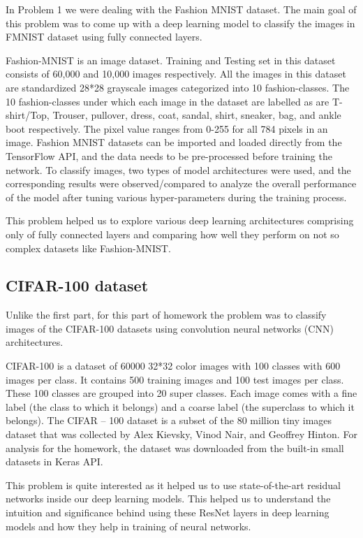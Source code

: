 \documentclass{article}
\begin{document}
In Problem 1 we were dealing with the Fashion MNIST dataset. The main goal of this problem was to come up with a deep learning model to classify the images in FMNIST dataset using fully connected layers.

Fashion-MNIST is an image dataset. Training and Testing set in this dataset consists of 60,000 and 10,000 images respectively. All the images in this dataset are standardized 28*28 grayscale images categorized into 10 fashion-classes. The 10 fashion-classes under which each image in the dataset are labelled as are T-shirt/Top, Trouser, pullover, dress, coat, sandal, shirt, sneaker, bag, and ankle boot respectively. The pixel value ranges from 0-255 for all 784 pixels in an image. Fashion MNIST datasets can be imported and loaded directly from the TensorFlow API, and the data needs to be pre-processed before training the network. To classify images, two types of model architectures were used, and the corresponding results were observed/compared to analyze the overall performance of the model after tuning various hyper-parameters during the training process.

This problem helped us to explore various deep learning architectures comprising only of fully connected layers and comparing how well they perform on not so complex datasets like Fashion-MNIST.

\subsection{CIFAR-100 dataset} 

Unlike the first part, for this part of homework the problem was to classify images of the CIFAR-100 datasets using convolution neural networks (CNN) architectures.\par

CIFAR-100 is a dataset of 60000 32*32 color images with 100 classes with 600 images per class. It contains 500 training images and 100 test images per class. These 100 classes are grouped into 20 super classes. Each image comes with a fine label (the class to which it belongs) and a coarse label (the superclass to which it belongs). The CIFAR – 100 dataset is a subset of the 80 million tiny images dataset that was collected by Alex Kievsky, Vinod Nair, and Geoffrey Hinton. For analysis for the homework, the dataset was downloaded from the built-in small datasets in Keras API.\par

This problem is quite interested as it helped us to use state-of-the-art residual networks inside our deep learning models. This helped us to understand the intuition and significance behind using these ResNet layers in deep learning models and how they help in training of neural networks.
\end{document}
